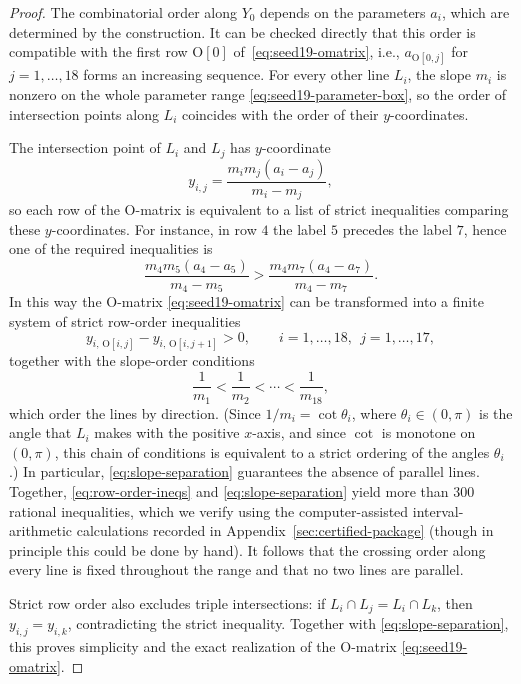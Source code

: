\begin{proof}
The combinatorial order along $Y_0$ depends on the parameters
$a_i$, which are determined by the construction. It can be checked directly that
this order is compatible with the first row $\mathrm{O}[0]$ of~\eqref{eq:seed19-omatrix},
i.e., $a_{\mathrm{O}[0,j]}$ for $j=1,\dots,18$ forms an increasing sequence.
For every other line $L_i$, the slope $m_i$ is nonzero on the whole
parameter range \eqref{eq:seed19-parameter-box}, so the order of intersection points
along $L_i$ coincides with the order of their $y$-coordinates.

The intersection point of $L_i$ and $L_j$ has $y$-coordinate
\begin{equation}
  y_{i,j}=\frac{m_i m_j(a_i-a_j)}{m_i-m_j},\label{eq:y-coordinate}
\end{equation}
so each row of the $\mathrm{O}$-matrix is equivalent to a list of strict
inequalities comparing these $y$-coordinates. For instance, in row $4$ the label $5$
precedes the label $7$, hence one of the required inequalities is
\[
  \frac{m_4 m_5(a_4-a_5)}{m_4-m_5}
  >
  \frac{m_4 m_7(a_4-a_7)}{m_4-m_7}.
\]
In this way the $\mathrm{O}$-matrix \eqref{eq:seed19-omatrix} can be transformed into a finite system of
strict row-order inequalities
\begin{equation}\label{eq:row-order-ineqs}
  y_{i,\,\mathrm{O}[i,j]} - y_{i,\,\mathrm{O}[i,j+1]} > 0,
  \qquad i=1,\dots,18,\  \  j=1,\dots,17,
\end{equation}
together with the slope-order conditions
\begin{equation}\label{eq:slope-separation}
  \frac{1}{m_1} < \frac{1}{m_2} < \cdots < \frac{1}{m_{18}},
\end{equation}
which order the lines by direction. (Since $1/m_i=\cot\theta_i$, where
$\theta_i\in(0,\pi)$ is the angle that $L_i$ makes with the positive $x$-axis,
and since $\cot$ is monotone on $(0,\pi)$, this chain of conditions
is equivalent to a strict ordering of the angles $\theta_i$.) In particular,
\eqref{eq:slope-separation} guarantees the absence of parallel lines.
Together, \eqref{eq:row-order-ineqs} and \eqref{eq:slope-separation} yield
more than $300$ rational inequalities, which we verify
using the computer-assisted interval-arithmetic calculations recorded in
Appendix~\ref{sec:certified-package} (though in principle this could be done by hand).
It follows that the crossing order along every line is fixed
throughout the range and that no two lines are parallel.

Strict row order also excludes triple intersections: if
$L_i\cap L_j = L_i\cap L_k$, then $y_{i,j}=y_{i,k}$, contradicting
the strict inequality. Together with
\eqref{eq:slope-separation}, this proves simplicity and the exact realization of the
$\mathrm{O}$-matrix \eqref{eq:seed19-omatrix}.
\end{proof}

